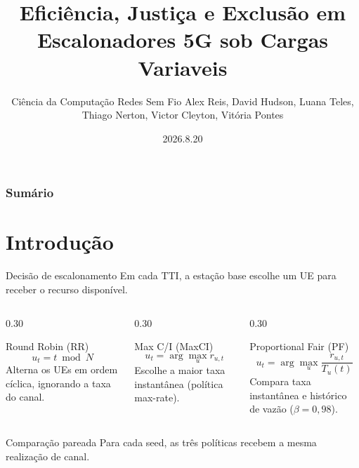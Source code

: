 \documentclass[noamsthm,notheorems,11pt,compress,fontset=windows]{beamer}
\title[Redes Sem Fio]{Eficiência, Justiça e Exclusão em Escalonadores 5G sob Cargas Variaveis}
\author[UFCA]
{
    \vskip 4mm
    Ciência da Computação \vskip 1mm
    Redes Sem Fio \vskip 1mm
    Alex Reis, David Hudson, Luana Teles, Thiago Nerton, Victor Cleyton, Vitória Pontes
}
\date[2026.8.20]{2026.8.20}
\numberwithin{figure}{section}
\numberwithin{table}{section}
\numberwithin{equation}{section}
\theoremstyle{plain} %
\begin{document}
\setlength{\baselineskip}{15pt}


{%
\begin{frame}
\titlepage %
\end{frame}}


\begin{frame}
\frametitle{Sumário}
\tableofcontents
\end{frame}



\section{Introdução}
\begin{frame}{Decisão de escalonamento}
Em cada TTI, a estação base escolhe um UE para receber o recurso disponível.

\begin{columns}[T,onlytextwidth]
\begin{column}{0.30\textwidth}
\begin{block}{Round Robin (RR)}
\[u_t=t\bmod N\]
\small Alterna os UEs em ordem cíclica, ignorando a taxa do canal.
\end{block}
\end{column}
\begin{column}{0.30\textwidth}
\begin{block}{Max C/I (MaxCI)}
\[u_t=\arg\max_u r_{u,t}\]
\small Escolhe a maior taxa instantânea (política max-rate).
\end{block}
\end{column}
\begin{column}{0.30\textwidth}
\begin{block}{Proportional Fair (PF)}
\[u_t=\arg\max_u \frac{r_{u,t}}{T_u(t)}\]
\small Compara taxa instantânea e histórico de vazão ($\beta=0{,}98$).
\end{block}
\end{column}
\end{columns}

\vspace{1mm}
\begin{alertblock}{Comparação pareada}
Para cada seed, as três políticas recebem a mesma realização de canal.
\end{alertblock}
\end{frame}
\end{document}
